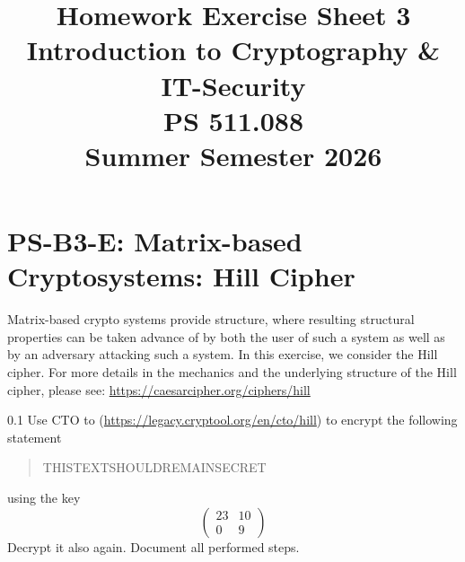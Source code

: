 \documentclass[]{scrartcl}
\title{Homework Exercise Sheet 3\\Introduction to Cryptography \& IT-Security\\PS 511.088\\Summer Semester 2026}
\author{\groupname}
\newcounter{exercise}
\newcounter{qid}[section]
\newcommand{\exerciseprefix}{prefix}
\newcommand{\questiontitle}{Questions}
\newcommand{\blockid}{B3}
\newcommand{\exname}{}
\begin{document}
\maketitle
{}
\date{}

\pagebreak




\pagebreak
\renewcommand{\exname}{Matrix-based Cryptosystems: Hill Cipher}
\section*{PS-\blockid{}-E\theexercise: \exname{}}
Matrix-based crypto systems provide structure, where resulting structural properties can be taken advance of by both the user of such a system as well as by an adversary attacking such a system. In this exercise, we consider the Hill cipher. For more details in the mechanics and the underlying structure of the Hill cipher, please see: \url{https://caesarcipher.org/ciphers/hill}



\renewcommand{\exerciseprefix}{PS-\blockid{}-E\theexercise: \exname-Q\theqid}
\renewcommand{\questiontitle}{\exerciseprefix{}: Encryption/Decryption in CTO}
\begin{exercisebox}{0.1}
Use CTO to (\url{https://legacy.cryptool.org/en/cto/hill}) to encrypt the following statement
\begin{quote}
    THISTEXTSHOULDREMAINSECRET
\end{quote}
using the key
\begin{equation} 
    \begin{pmatrix}
    23 & 10 \\
     0 &  9
     \end{pmatrix}
\end{equation}
Decrypt it also again. Document all performed steps.  
\end{exercisebox}
\end{document}
